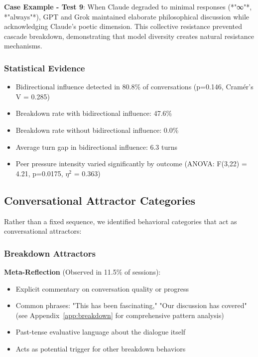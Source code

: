 \documentclass[11pt,letterpaper]{article}
\newcommand{\exponedataBidirectionalPercentage}{80.8\%}
\newcommand{\exponedataBidirectionalPValue}{p=0.146}
\newcommand{\exponedataMetaReflectionTriggers}{11.5\%}
\newcommand{\exponedataBidirectionalTurnGap}{6.3}
\newcommand{\exponedataBidirectionalBreakdownRate}{47.6\%}
\newcommand{\exponedataNonBidirectionalBreakdownRate}{0.0\%}
\newcommand{\exponedataPeerPressureANOVAPValue}{p=0.0175}
\begin{document}
\textbf{Case Example - Test 9}:
When Claude degraded to minimal responses (*"∞"*, *"always"*), GPT and Grok maintained elaborate philosophical discussion while acknowledging Claude's poetic dimension. This collective resistance prevented cascade breakdown, demonstrating that model diversity creates natural resistance mechanisms.

\subsubsection{Statistical Evidence}
\begin{itemize}
    \item Bidirectional influence detected in \exponedataBidirectionalPercentage{} of conversations (\exponedataBidirectionalPValue{}, Cramér's V = 0.285)
    \item Breakdown rate with bidirectional influence: \exponedataBidirectionalBreakdownRate{}
    \item Breakdown rate without bidirectional influence: \exponedataNonBidirectionalBreakdownRate{}
    \item Average turn gap in bidirectional influence: \exponedataBidirectionalTurnGap{} turns
    \item Peer pressure intensity varied significantly by outcome (ANOVA: F(3,22) = 4.21, \exponedataPeerPressureANOVAPValue{}, $\eta^2$ = 0.363)
\end{itemize}


\subsection{Conversational Attractor Categories}

Rather than a fixed sequence, we identified behavioral categories that act as conversational attractors:

\subsubsection{Breakdown Attractors}

\textbf{Meta-Reflection} (Observed in \exponedataMetaReflectionTriggers{} of sessions):
\begin{itemize}
    \item Explicit commentary on conversation quality or progress
    \item Common phrases: "This has been fascinating," "Our discussion has covered" (see Appendix~\ref{app:breakdown} for comprehensive pattern analysis)
    \item Past-tense evaluative language about the dialogue itself
    \item Acts as potential trigger for other breakdown behaviors
\end{itemize}
\end{document}
